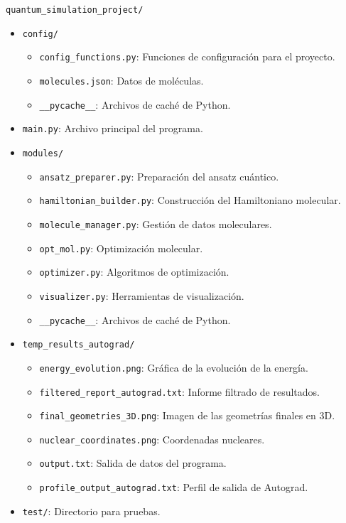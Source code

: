 \begin{ProjectStructure}
  \texttt{quantum\_simulation\_project/}
  \begin{itemize}[label={}, left=1em]
      \item \texttt{config/}
      \begin{itemize}[label={}, left=2em]
          \item \texttt{config\_functions.py}: Funciones de configuración para el proyecto.
          \item \texttt{molecules.json}: Datos de moléculas.
          \item \texttt{\_\_pycache\_\_}: Archivos de caché de Python.
      \end{itemize}
      \item \texttt{main.py}: Archivo principal del programa.
      \item \texttt{modules/}
      \begin{itemize}[label={}, left=2em]
          \item \texttt{ansatz\_preparer.py}: Preparación del ansatz cuántico.
          \item \texttt{hamiltonian\_builder.py}: Construcción del Hamiltoniano molecular.
          \item \texttt{molecule\_manager.py}: Gestión de datos moleculares.
          \item \texttt{opt\_mol.py}: Optimización molecular.
          \item \texttt{optimizer.py}: Algoritmos de optimización.
          \item \texttt{visualizer.py}: Herramientas de visualización.
          \item \texttt{\_\_pycache\_\_}: Archivos de caché de Python.
      \end{itemize}
      \item \texttt{temp\_results\_autograd/}
      \begin{itemize}[label={}, left=2em]
          \item \texttt{energy\_evolution.png}: Gráfica de la evolución de la energía.
          \item \texttt{filtered\_report\_autograd.txt}: Informe filtrado de resultados.
          \item \texttt{final\_geometries\_3D.png}: Imagen de las geometrías finales en 3D.
          \item \texttt{nuclear\_coordinates.png}: Coordenadas nucleares.
          \item \texttt{output.txt}: Salida de datos del programa.
          \item \texttt{profile\_output\_autograd.txt}: Perfil de salida de Autograd.
      \end{itemize}
      \item \texttt{test/}: Directorio para pruebas.
  \end{itemize}
\end{ProjectStructure}
